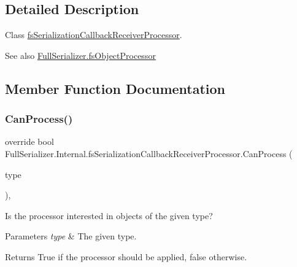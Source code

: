 \subsection{Detailed Description}
Class \hyperlink{class_full_serializer_1_1_internal_1_1fs_serialization_callback_receiver_processor}{fs\+Serialization\+Callback\+Receiver\+Processor}. 

\begin{DoxySeeAlso}{See also}
\hyperlink{class_full_serializer_1_1fs_object_processor}{Full\+Serializer.\+fs\+Object\+Processor}


\end{DoxySeeAlso}


\subsection{Member Function Documentation}
\mbox{\label{class_full_serializer_1_1_internal_1_1fs_serialization_callback_receiver_processor_ae3e6db6e345aea48bb0cb8e63e8f4d6f}} 
\subsubsection{\texorpdfstring{Can\+Process()}{CanProcess()}}
{\footnotesize\ttfamily override bool Full\+Serializer.\+Internal.\+fs\+Serialization\+Callback\+Receiver\+Processor.\+Can\+Process (\begin{DoxyParamCaption}\item[{Type}]{type }\end{DoxyParamCaption})\hspace{0.3cm}{\ttfamily [inline]}, {\ttfamily [virtual]}}



Is the processor interested in objects of the given type? 


\begin{DoxyParams}{Parameters}
{\em type} & The given type.\\
\hline
\end{DoxyParams}
\begin{DoxyReturn}{Returns}
True if the processor should be applied, false otherwise.
\end{DoxyReturn}


